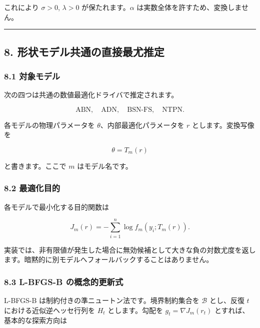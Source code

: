 \documentclass[
]{article}
\begin{document}
これにより \(\sigma>0\), \(\lambda>0\) が保たれます。\(\alpha\)
は実数全体を許すため、変換しません。

\begin{center}\rule{0.5\linewidth}{0.5pt}\end{center}

\hypertarget{ux5f62ux72b6ux30e2ux30c7ux30ebux5171ux901aux306eux76f4ux63a5ux6700ux5c24ux63a8ux5b9a}{%
\subsection{8.
形状モデル共通の直接最尤推定}\label{ux5f62ux72b6ux30e2ux30c7ux30ebux5171ux901aux306eux76f4ux63a5ux6700ux5c24ux63a8ux5b9a}}

\hypertarget{ux5bfeux8c61ux30e2ux30c7ux30eb}{%
\subsubsection{8.1 対象モデル}\label{ux5bfeux8c61ux30e2ux30c7ux30eb}}

次の四つは共通の数値最適化ドライバで推定されます。

\[
\mathrm{ABN},\quad \mathrm{ADN},\quad \mathrm{BSN\text{-}FS},\quad \mathrm{NTPN}.
\]

各モデルの物理パラメータを \(\theta\)、内部最適化パラメータを \(r\)
とします。変換写像を

\[
\theta=T_m(r)
\]

と書きます。ここで \(m\) はモデル名です。

\hypertarget{ux6700ux9069ux5316ux76eeux7684}{%
\subsubsection{8.2 最適化目的}\label{ux6700ux9069ux5316ux76eeux7684}}

各モデルで最小化する目的関数は

\[
J_m(r)
=-\sum_{i=1}^{n}\log f_m(y_i;T_m(r)).
\]

実装では、非有限値が発生した場合に無効候補として大きな負の対数尤度を返します。暗黙的に別モデルへフォールバックすることはありません。

\hypertarget{l-bfgs-b-ux306eux6982ux5ff5ux7684ux66f4ux65b0ux5f0f}{%
\subsubsection{8.3 L-BFGS-B
の概念的更新式}\label{l-bfgs-b-ux306eux6982ux5ff5ux7684ux66f4ux65b0ux5f0f}}

L-BFGS-B は制約付きの準ニュートン法です。境界制約集合を \(\mathcal{B}\)
とし、反復 \(t\) における近似逆ヘッセ行列を \(H_t\) とします。勾配を
\(g_t=\nabla J_m(r_t)\) とすれば、基本的な探索方向は
\end{document}
